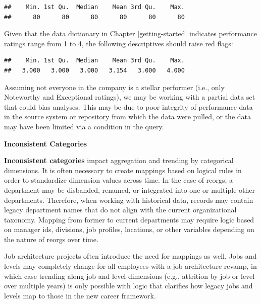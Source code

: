\documentclass[
]{book}
\newenvironment{Shaded}{\begin{snugshade}}{\end{snugshade}}
\newcommand{\CommentTok}[1]{\textcolor[rgb]{0.56,0.35,0.01}{\textit{#1}}}
\newcommand{\FunctionTok}[1]{\textcolor[rgb]{0.00,0.00,0.00}{#1}}
\newcommand{\NormalTok}[1]{#1}
\newcommand{\SpecialCharTok}[1]{\textcolor[rgb]{0.00,0.00,0.00}{#1}}
\begin{document}
\begin{verbatim}
##    Min. 1st Qu.  Median    Mean 3rd Qu.    Max. 
##      80      80      80      80      80      80
\end{verbatim}

Given that the data dictionary in Chapter \ref{getting-started} indicates performance ratings range from 1 to 4, the following descriptives should raise red flags:

\begin{Shaded}
\end{Shaded}

\begin{verbatim}
##    Min. 1st Qu.  Median    Mean 3rd Qu.    Max. 
##   3.000   3.000   3.000   3.154   3.000   4.000
\end{verbatim}

Assuming not everyone in the company is a stellar performer (i.e., only Noteworthy and Exceptional ratings), we may be working with a partial data set that could bias analyses. This may be due to poor integrity of performance data in the source system or repository from which the data were pulled, or the data may have been limited via a condition in the query.

\textbf{Inconsistent Categories}

\textbf{Inconsistent categories} impact aggregation and trending by categorical dimensions. It is often necessary to create mappings based on logical rules in order to standardize dimension values across time. In the case of reorgs, a department may be disbanded, renamed, or integrated into one or multiple other departments. Therefore, when working with historical data, records may contain legacy department names that do not align with the current organizational taxonomy. Mapping from former to current departments may require logic based on manager ids, divisions, job profiles, locations, or other variables depending on the nature of reorgs over time.

Job architecture projects often introduce the need for mappings as well. Jobs and levels may completely change for all employees with a job architecture revamp, in which case trending along job and level dimensions (e.g., attrition by job or level over multiple years) is only possible with logic that clarifies how legacy jobs and levels map to those in the new career framework.
\end{document}
